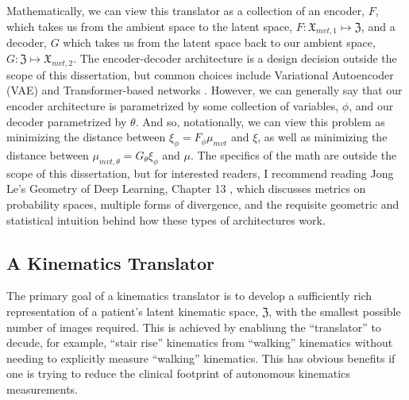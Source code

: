 Mathematically, we can view this translator as a collection of an encoder, $F$, which takes us from the ambient space to the latent space, $F: \mathfrak{X}_{mvt,1} \mapsto \mathfrak{Z}$, and a decoder, $G$ which takes us from the latent space back to our ambient space, $G: \mathfrak{Z} \mapsto \mathfrak{X}_{mvt,2}$. The encoder-decoder architecture is a design decision outside the scope of this dissertation, but common choices include Variational Autoencoder (VAE) and Transformer-based networks \cite{vaswaniAttentionAllYou2017}.
However, we can generally say that our encoder architecture is parametrized by some collection of variables, $\phi$, and our decoder parametrized by $\theta$.
And so, notationally, we can view this problem as minimizing the distance between $\xi_{\phi} = F_{\phi}\mu_{mvt}$ and $\xi$, as well as minimizing the distance between $\mu_{mvt,\theta} = G_{\theta}\xi_{\phi}$ and $\mu$.
The specifics of the math are outside the scope of this dissertation, but for interested readers, I recommend reading Jong Le's Geometry of Deep Learning, Chapter 13 \cite{yeGeometryDeepLearning2022}, which discusses metrics on probability spaces, multiple forms of divergence, and the requisite geometric and statistical intuition behind how these types of architectures work.

\subsection{A Kinematics Translator}
The primary goal of a kinematics translator is to develop a sufficiently rich representation of a patient's latent kinematic space, $\mathfrak{Z}$, with the smallest possible number of images required.
This is achieved by enabliung the ``translator'' to decude, for example, ``stair rise'' kinematics from ``walking'' kinematics without needing to explicitly measure ``walking'' kinematics.
This has obvious benefits if one is trying to reduce the clinical footprint of autonomous kinematics measurements.

